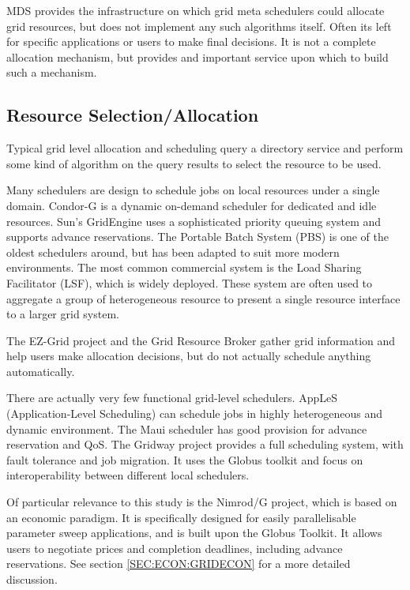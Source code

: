 MDS provides the infrastructure on which grid meta schedulers could allocate
grid resources, but does not implement any such algorithms itself. Often its
left for specific applications or users to make final decisions. It is not a
complete allocation mechanism, but provides and important service upon which to
build such a mechanism.

\subsection{Resource Selection/Allocation}

Typical grid level allocation and scheduling query a directory service and
perform some kind of algorithm on the query results to select the resource to
be used.

Many schedulers are design to schedule jobs on local resources under a single
domain. Condor-G\cite{grid-frey01-condor-g} is a dynamic on-demand scheduler
for dedicated and idle resources. Sun's GridEngine\cite{grid-bulhoes04-sge}
uses a sophisticated priority queuing system and supports advance reservations.
The Portable Batch System (PBS) \cite{grid-henderson95-pbs} is one of the
oldest schedulers around, but has been adapted to suit more modern
environments. The most common commercial system is the Load Sharing Facilitator
(LSF)\cite{grid-lsf-www}, which is widely deployed. These system are often used
to aggregate a group of heterogeneous resource to present a single resource
interface to a larger grid system.

The EZ-Grid project\cite{grid-chapman01-ezgrid} and the Grid Resource
Broker\cite{grid-aloisio02-grb} gather grid information and help users make
allocation decisions, but do not actually schedule anything automatically.

There are actually very few functional grid-level schedulers. AppLeS
(Application-Level Scheduling) \cite{grid-berman03-apples} can schedule jobs
in highly heterogeneous and dynamic environment. The Maui scheduler
\cite{grid-maui-www} has good provision for advance reservation and QoS. The
Gridway project \cite{grid-gridway-www} provides a full scheduling system, with
fault tolerance and job migration. It uses the Globus toolkit and focus on
interoperability between different local schedulers.

Of particular relevance to this study is the
Nimrod/G\cite{grid-buyya00-nimrod-g} project, which is based on an economic
paradigm. It is specifically designed for easily parallelisable parameter sweep
applications, and is built upon the Globus Toolkit. It allows users to
negotiate prices and completion deadlines, including advance reservations.  See
section \ref{SEC:ECON:GRIDECON} for a more detailed discussion.


